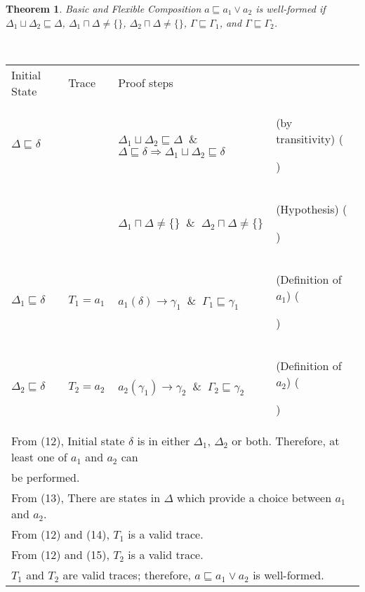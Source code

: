 \documentclass[12pt,journal,letterpaper,onecolumn]{IEEEtran}
\newcounter{myCounter}
\renewcommand{\themyCounter}{\arabic{myCounter}\addtocounter{myCounter}{1}}
\newtheorem{theorem}{Theorem}[section]
\begin{document}
\begin{theorem}
Basic and Flexible Composition $a\sqsubseteq a_1 \vee a_2$ is
well-formed if $ \Delta_1 \sqcup \Delta_2 \sqsubseteq \Delta$,
$\Delta_1 \sqcap \Delta \neq \{ \} $, $\Delta_2 \sqcap \Delta \neq
\{ \}$,  $ \Gamma \sqsubseteq \Gamma_1 $, and $ \Gamma \sqsubseteq
\Gamma_2$. \label{theorem:basicflexiblechoice}\end{theorem}
\\
\begin{minipage}{6in} \begin{center}
\begin{tabular}{llp{8cm}p{3.8cm}}
Initial State & Trace &  Proof steps & \\
$\Delta \sqsubseteq \delta$ &  & $\Delta_1 \sqcup \Delta_2 \sqsubseteq \Delta $ $~\&~$ $ \Delta \sqsubseteq \delta \Rightarrow \Delta_1 \sqcup \Delta_2 \sqsubseteq \delta$& (by transitivity) \hfill(\themyCounter)\\
 & &$\Delta_1 \sqcap \Delta \neq \{ \} $ $~\&~$ $ \Delta_2 \sqcap \Delta \neq \{ \} $ & (Hypothesis) \hfill(\themyCounter)\\
$\Delta_1 \sqsubseteq \delta$ & $T_1 = a_1$ & $a_1(\delta)\rightarrow \gamma_1 $ $~\&~$ $ \Gamma_1 \sqsubseteq \gamma_1$ & (Definition of $a_1$) \hfill(\themyCounter) \\
$\Delta_2 \sqsubseteq \delta$ & $T_2 = a_2$ & $a_2(\gamma_1)\rightarrow \gamma_2 $ $~\&~$ $ \Gamma_2 \sqsubseteq \gamma_2$ & (Definition of $a_2$) \hfill(\themyCounter) \\
\multicolumn{4}{l}{From (12), Initial state $\delta$ is in either $\Delta_1$, $\Delta_2$ or both. Therefore, at least one of $a_1$ and $a_2$ can}\\
\multicolumn{4}{l}{be performed.} \\
\multicolumn{4}{l}{From (13), There are states in $\Delta$ which provide a choice between $a_1$ and $a_2$.}\\
\multicolumn{4}{l}{From (12) and (14), $T_1$ is a valid trace.} \\
\multicolumn{4}{l}{From (12) and (15), $T_2$ is a valid trace.}\\
\multicolumn{4}{l}{$T_1$ and $T_2$ are valid traces; therefore,
$a\sqsubseteq a_1 \vee a_2$ is well-formed.} \hfill$\Box$
\end{tabular}
\end{center}
\end{minipage}\\
\end{document}
